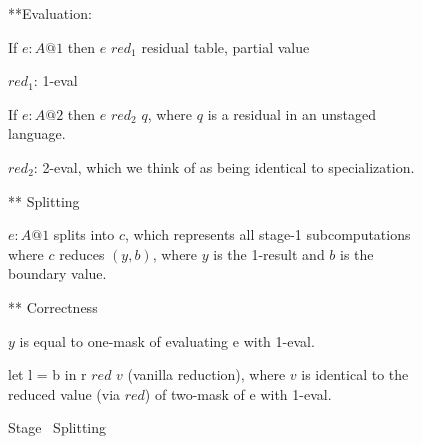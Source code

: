 \begin{figure*}

**Evaluation:

If  
$e: A @ 1$
then
$e$ $red_1$ residual table, partial value

$red_1$: 1-eval

If 
$e: A @ 2$ 
then
$e$ $red_2$ $q$, where $q$ is a residual in an unstaged language.

$red_2$: 2-eval,  which we think of as being identical to specialization. 

** Splitting

$e:A@1$ splits into $c$, which represents all stage-1 subcomputations
where $c$ reduces $(y,b)$, where $y$ is the 1-result and $b$ is the
boundary value.  

 
** Correctness

$y$ is equal to one-mask of evaluating e with 1-eval.

let l = b in r $red$ $v$ (vanilla reduction), where $v$ is identical
to the reduced value (via $red$) of two-mask of  e with 1-eval.

\caption{Stage \bbtwo\ Splitting}
\label{fig:termSplitTwo}
\end{figure*}

